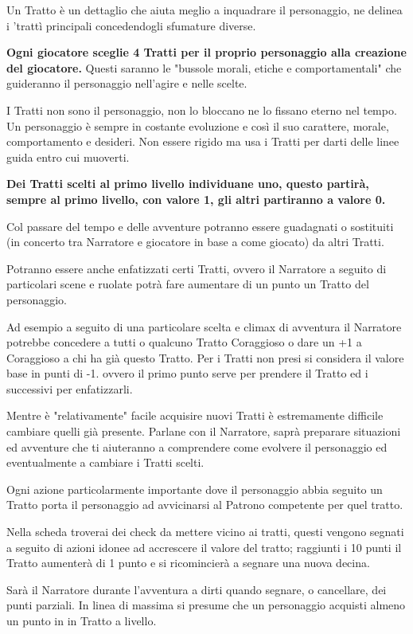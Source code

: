 \documentclass[a4paper,11pt,twoside,openany]{book}
\begin{document}
Un Tratto è un dettaglio che aiuta meglio a inquadrare il personaggio, ne delinea i 'trattì principali concedendogli sfumature diverse.

\textbf{Ogni giocatore sceglie 4 Tratti per il proprio personaggio alla creazione del giocatore.} Questi saranno le "bussole morali, etiche e comportamentali" che guideranno il personaggio nell'agire e nelle scelte.

I Tratti non sono il personaggio, non lo bloccano ne lo fissano eterno nel tempo. Un personaggio è sempre in costante evoluzione e così il suo carattere, morale, comportamento e desideri. Non essere rigido ma usa i Tratti per darti delle linee guida entro cui muoverti.

\textbf{Dei Tratti scelti al primo livello individuane uno, questo partirà, sempre al primo livello, con valore 1, gli altri partiranno a valore 0.}

Col passare del tempo e delle avventure potranno essere guadagnati o sostituiti (in concerto tra Narratore e giocatore in base a come giocato) da altri Tratti.

Potranno essere anche enfatizzati certi Tratti, ovvero il Narratore a seguito di particolari scene e ruolate potrà fare aumentare di un punto un Tratto del personaggio.

Ad esempio a seguito di una particolare scelta e climax di avventura il Narratore potrebbe concedere a tutti o qualcuno Tratto Coraggioso o dare un +1 a Coraggioso a chi ha già questo Tratto. Per i Tratti non presi si considera il valore base in punti di -1. ovvero il primo punto serve per prendere il Tratto ed i successivi per enfatizzarli.

Mentre è "relativamente" facile acquisire nuovi Tratti è estremamente difficile cambiare quelli già presente. Parlane con il Narratore, saprà preparare situazioni ed avventure che ti aiuteranno a comprendere come evolvere il personaggio ed eventualmente a cambiare i Tratti scelti.

Ogni azione particolarmente importante dove il personaggio abbia seguito un Tratto porta il personaggio ad avvicinarsi al Patrono competente per quel tratto.

Nella scheda troverai dei check da mettere vicino ai tratti, questi vengono segnati a seguito di azioni idonee ad accrescere il valore del tratto; raggiunti i 10 punti il Tratto aumenterà di 1 punto e si ricomincierà a segnare una nuova decina.

Sarà il Narratore durante l'avventura a dirti quando segnare, o cancellare, dei punti parziali. In linea di massima si presume che un personaggio acquisti almeno un punto in in Tratto a livello.
\end{document}
